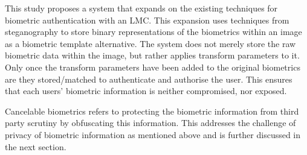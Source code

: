 This study proposes a system that expands on the existing techniques for biometric authentication with an LMC. This expansion uses techniques from steganography to store binary representations of the biometrics within an image as a biometric template alternative. The system does not merely store the raw biometric data within the image, but rather applies transform parameters to it. Only once the transform parameters have been added to the original biometrics are they stored/matched to authenticate and authorise the user. This ensures that each users’ biometric information is neither compromised, nor exposed. 

Cancelable biometrics refers to protecting the biometric information from third party scrutiny by obfuscating this information. This addresses the challenge of privacy of biometric information as mentioned above and is further discussed in the next section.


